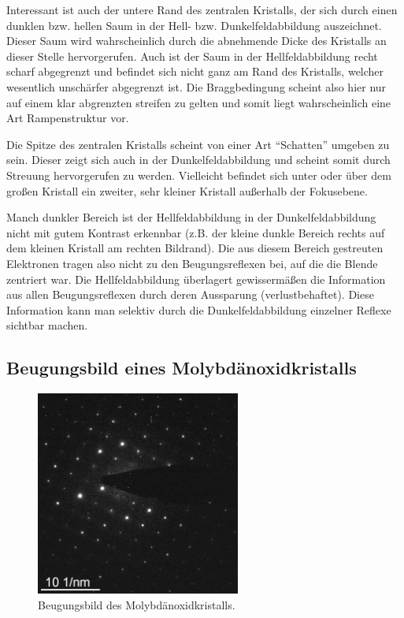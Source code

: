 \documentclass[slug=TEM, room=IFW, supervisor=?, coursedate=23.\ 01.\ 2020]{../../Lab_Report_LaTeX/lab_report}
\begin{document}
Interessant ist auch der untere Rand des zentralen Kristalls, der sich
durch einen dunklen bzw. hellen Saum in der Hell-
bzw. Dunkelfeldabbildung auszeichnet. Dieser Saum wird wahrscheinlich
durch die abnehmende Dicke des Kristalls an dieser Stelle
hervorgerufen. Auch ist der Saum in der Hellfeldabbildung recht scharf
abgegrenzt und befindet sich nicht ganz am Rand des Kristalls, welcher
wesentlich unsch\"arfer abgegrenzt ist. Die Braggbedingung scheint
also hier nur auf einem klar abgrenzten streifen zu gelten und somit
liegt wahrscheinlich eine Art Rampenstruktur vor.

Die Spitze des zentralen Kristalls scheint von einer Art ``Schatten''
umgeben zu sein. Dieser zeigt sich auch in der Dunkelfeldabbildung und
scheint somit durch Streuung hervorgerufen zu werden. Vielleicht
befindet sich unter oder \"uber dem gro\ss{}en Kristall ein zweiter,
sehr kleiner Kristall au\ss{}erhalb der Fokusebene.

Manch dunkler Bereich ist der Hellfeldabbildung in der
Dunkelfeldabbildung nicht mit gutem Kontrast erkennbar (z.B. der
kleine dunkle Bereich rechts auf dem kleinen Kristall am rechten
Bildrand). Die aus diesem Bereich gestreuten Elektronen tragen also
nicht zu den Beugungsreflexen bei, auf die die Blende zentriert war.
Die Hellfeldabbildung \"uberlagert gewisserm\"a\ss{}en die Information
aus allen Beugungsreflexen durch deren Aussparung
(verlustbehaftet). Diese Information kann man selektiv durch die
Dunkelfeldabbildung einzelner Reflexe sichtbar machen.

\subsection{Beugungsbild eines Molybdänoxidkristalls}
\label{sec:beugungmolyb}

\begin{figure}[h]
  \centering
  \includegraphics[width=0.6\textwidth]{../messungen/molybdaen/auswertung/MoO_diffr_5_m.jpg}%
  \caption{Beugungsbild des Molybdänoxidkristalls.}
  \label{fig:molbeug}
\end{figure}
\end{document}
